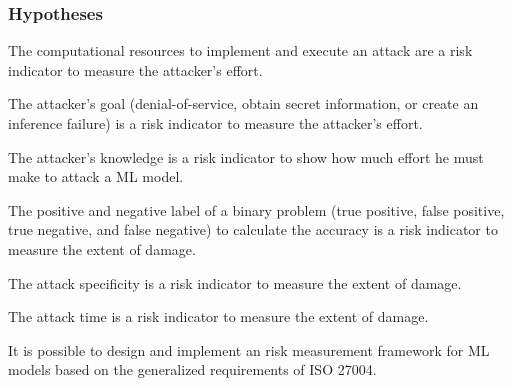 \subsubsection*{Hypotheses}


\begin{hypotheses}
  \item The computational resources to implement and execute an attack are a risk indicator to measure the attacker's effort. \label{itm:h1}
  \item The attacker's goal (denial-of-service, obtain secret information, or create an inference failure) is a risk indicator to measure the attacker's effort. \label{itm:h2}
  \item The attacker's knowledge is a risk indicator to show how much effort he must make to attack a ML model. \label{itm:h3}
  \item The positive and negative label of a binary problem (true positive, false positive, true negative, and false negative) to calculate the accuracy is a risk indicator to measure the extent of damage. \label{itm:h4}
  \item The attack specificity is a risk indicator to measure the extent of damage. \label{itm:h5}
  \item The attack time is a risk indicator to measure the extent of damage. \label{itm:h6}
  \item It is possible to design and implement an risk measurement framework for ML models based on the generalized requirements of ISO 27004. \label{itm:h7}
\end{hypotheses}
